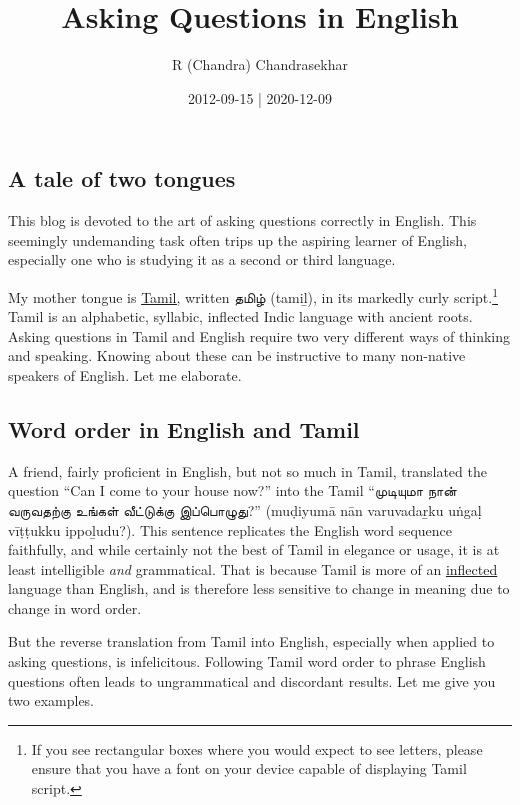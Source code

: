 \documentclass[
  11pt,
  british,
  a4paper,
]{article}
\title{Asking Questions in English}
\author{R (Chandra) Chandrasekhar}
\date{2012-09-15 | 2020-12-09}
\begin{document}
\maketitle

\thispagestyle{empty}


\hypertarget{a-tale-of-two-tongues}{%
\subsection{A tale of two tongues}\label{a-tale-of-two-tongues}}

This blog is devoted to the art of asking questions correctly in
English. This seemingly undemanding task often trips up the aspiring
learner of English, especially one who is studying it as a second or
third language.

My mother tongue is
\href{http://en.wikipedia.org/wiki/Tamil_language}{Tamil,} written தமிழ்
(tamiḻ), in its markedly curly script.\footnote{If you see rectangular
  boxes where you would expect to see letters, please ensure that you
  have a font on your device capable of displaying Tamil script.} Tamil
is an alphabetic, syllabic, inflected Indic language with ancient roots.
Asking questions in Tamil and English require two very different ways of
thinking and speaking. Knowing about these can be instructive to many
non-native speakers of English. Let me elaborate.

\hypertarget{word-order-in-english-and-tamil}{%
\subsection{Word order in English and
Tamil}\label{word-order-in-english-and-tamil}}

A friend, fairly proficient in English, but not so much in Tamil,
translated the question ``Can I come to your house now?'' into the Tamil
``முடியுமா நான் வருவதற்கு உங்கள் வீட்டுக்கு இப்பொழுது?'' (muḍiyumā nān
varuvadaṟku uṅgaḷ vīṭṭukku ippoḻudu?). This sentence replicates the
English word sequence faithfully, and while certainly not the best of
Tamil in elegance or usage, it is at least intelligible \emph{and}
grammatical. That is because Tamil is more of an
\href{http://en.wikipedia.org/wiki/Inflection}{inflected} language than
English, and is therefore less sensitive to change in meaning due to
change in word order.

But the reverse translation from Tamil into English, especially when
applied to asking questions, is infelicitous. Following Tamil word order
to phrase English questions often leads to ungrammatical and discordant
results. Let me give you two examples.
\end{document}
